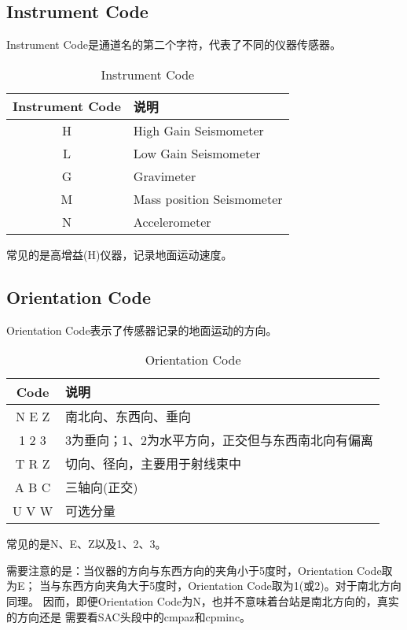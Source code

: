 \subsection{Instrument Code}
Instrument Code是通道名的第二个字符，代表了不同的仪器传感器。
\begin{table}[H]
\centering
\caption{Instrument Code}
\begin{tabular}{cl}
\toprule
Instrument Code    &     说明   \\
\midrule
H        &       High Gain Seismometer      \\
L        &       Low Gain Seismometer       \\
G        &       Gravimeter                 \\
M        &       Mass position Seismometer  \\
N        &       Accelerometer              \\
\bottomrule
\end{tabular}
\end{table}
常见的是高增益(H)仪器，记录地面运动速度。

\subsection{Orientation Code}
Orientation Code表示了传感器记录的地面运动的方向。
\begin{table}[H]
\centering
\caption{Orientation Code}
\begin{tabular}{cl}
\toprule
Code     &     说明   \\
\midrule
N E Z   &   南北向、东西向、垂向   \\
1 2 3   &   3为垂向；1、2为水平方向，正交但与东西南北向有偏离   \\
T R Z   &   切向、径向，主要用于射线束中    \\
A B C   &   三轴向(正交)    \\
U V W   &   可选分量    \\
\bottomrule
\end{tabular}
\end{table}
常见的是N、E、Z以及1、2、3。

需要注意的是：当仪器的方向与东西方向的夹角小于5度时，Orientation Code取为E；
当与东西方向夹角大于5度时，Orientation Code取为1(或2)。对于南北方向同理。
因而，即便Orientation Code为N，也并不意味着台站是南北方向的，真实的方向还是
需要看SAC头段中的cmpaz和cpminc。
